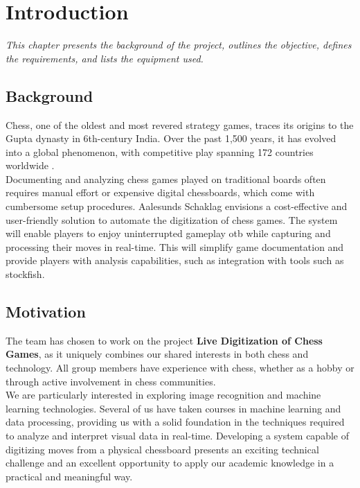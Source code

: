 \chapter{Introduction}

\begin{center} 
\textit{This chapter presents the background of the project, outlines the objective, defines the requirements, and lists the equipment used.}
\end{center}


\section{Background}

Chess, one of the oldest and most revered strategy games, traces its origins to the Gupta dynasty in 6th-century India. Over the past 1,500 years, it has evolved into a global phenomenon, with competitive play spanning 172 countries worldwide \cite{artsnculture}. \\

Documenting and analyzing chess games played on traditional boards often requires manual effort or expensive digital chessboards, which come with cumbersome setup procedures. Aalesunds Schaklag envisions a cost-effective and user-friendly solution to automate the digitization of chess games.  The system will enable players to enjoy uninterrupted gameplay \gls{otb} while capturing and processing their moves in real-time. This will simplify game documentation and provide players with analysis capabilities, such as integration with tools such as \gls{stockfish}.

\section{Motivation}

The team has chosen to work on the project \textbf{Live Digitization of Chess Games}, as it uniquely combines our shared interests in both chess and technology. All group members have experience with chess, whether as a hobby or through active involvement in chess communities. \\

We are particularly interested in exploring image recognition and machine learning technologies. Several of us have taken courses in machine learning and data processing, providing us with a solid foundation in the techniques required to analyze and interpret visual data in real-time. Developing a system capable of digitizing moves from a physical chessboard presents an exciting technical challenge and an excellent opportunity to apply our academic knowledge in a practical and meaningful way.


